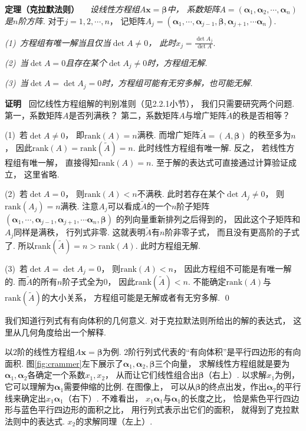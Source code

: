 \medskip

\textbf{定理（克拉默法则）}~~
\textit{设线性方程组$A\bm{x} = \bm{\beta}$中，
系数矩阵$A = (\bm{\alpha}_1 , \bm{\alpha}_2 , \cdots , \bm{\alpha}_n)$是$n$阶方阵.}
对于$j = 1,2,\cdots ,n$，
记矩阵$A_j = (\bm{\alpha}_1 , \cdots , \bm{\alpha}_{j-1} , \bm{\beta} , \bm{\alpha}_{j+1} , \cdots   \bm{\alpha}_n)$.

\medskip

\textit{(1)~方程组有唯一解当且仅当$\det A \ne 0$，
此时$x_j = \frac{\det A_j}{\det A}$}.

\medskip

\textit{(2)~当$\det A = 0$且存在某个$\det A_j \ne 0$时，方程组无解.}

\textit{(3)~当$\det A = \det A_j = 0$时，方程组可能有无穷多解，也可能无解.}

\medskip

\textbf{证明\ }
回忆线性方程组解的判别准则（见2.2.1小节），
我们只需要研究两个问题.
第一，系数矩阵$A$是否列满秩？
第二，系数矩阵$A$与增广矩阵$\tilde{A}$的秩是否相等？

(1)~若$\det A \ne 0$，
即$\mathrm{rank}(A) = n$满秩.
而增广矩阵$\tilde{A} = (A , \bm{\beta})$
的秩至多为$n$，
因此$\mathrm{rank}(A) = \mathrm{rank}(\tilde{A}) = n$.
此时线性方程组有唯一解.
反之，
若线性方程组有唯一解，
直接得知$\mathrm{rank}(A) = n$.
至于解的表达式可直接通过计算验证成立，
这里省略.

(2)~若$\det A = 0$，
则$\mathrm{rank}(A) < n$不满秩.
此时若存在某个$\det A_j \ne 0$，
则$\mathrm{rank}(A_j) = n$满秩.
注意$A_j$可以看成$\tilde{A}$的一个$n$阶子矩阵
$(\bm{\alpha}_1 , \cdots , \bm{\alpha}_{j-1} , \bm{\alpha}_{j+1} , \cdots \bm{\alpha}_n, \bm{\beta}) $
的列向量重新排列之后得到的，
因此这个子矩阵和$A_j$同样是满秩，
行列式非零.
这就表明$\tilde{A}$有$n$阶非零子式，
而且没有更高阶的子式了.
所以$\mathrm{rank}(\tilde{A}) = n > \mathrm{rank}(A)$.
此时方程组无解.

(3)~若$\det A = \det A_j = 0$，
则$\mathrm{rank}(A) < n$，
因此方程组不可能是有唯一解的.
而$\tilde{A}$的所有$n$阶子式全为$0$，
因此$\mathrm{rank}(\tilde{A}) < n$.
不能确定$\mathrm{rank}(A)$与$\mathrm{rank}(\tilde{A})$的大小关系，
方程组可能是无解或者有无穷多解. \qed

\medskip

我们知道行列式有有向体积的几何意义.
对于克拉默法则所给出的解的表达式，
这里从几何角度给出一个解释.

以$2$阶的线性方程组$A \bm{x} = \bm{\beta}$为例.
$2$阶行列式代表的“有向体积”是平行四边形的有向面积.
图\ref{fig:crammer}左下展示了$\bm{\alpha}_1 , \bm{\alpha}_2, \bm{\beta}$三个向量，
求解线性方程组就是要为$\bm{\alpha}_1 , \bm{\alpha}_2$各确定一个系数$x_1,x_2$，
从而让它们线性组合出$\bm{\beta}$（右上）.
以求解$x_1$为例，
它可以理解为$\bm{\alpha}_1$需要伸缩的比例.
在图像上，
可以从$\bm{\beta}$的终点出发，作出$\bm{\alpha}_2$的平行线来确定出$x_1 \bm{\alpha}_1$（右下）.
不难看出，
$x_1 \bm{\alpha}_1$与$\bm{\alpha}_1$的长度之比，
恰是紫色平行四边形与蓝色平行四边形的面积之比，
用行列式表示出它们的面积，
就得到了克拉默法则中的表达式.
$x_2$的求解同理（左上）.



